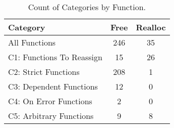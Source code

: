 \begin{table}[H]
   \begin{center}
   \begin{tabularx}{0.6\linewidth}{l|c|c}

      Category & Free & Realloc \\
      \hline

      All Functions& 246 & 35 \\

      C1: Functions To Reassign& 15 & 26 \\

      C2: Strict Functions& 208 & 1 \\

      C3: Dependent Functions& 12 & 0 \\

      C4: On Error Functions& 2 & 0 \\

      C5: Arbitrary Functions& 9 & 8 \\

   \end{tabularx}
\end{center}
   \caption{Count of Categories by Function.}
   \label{tab:categories:overview}
\end{table}


